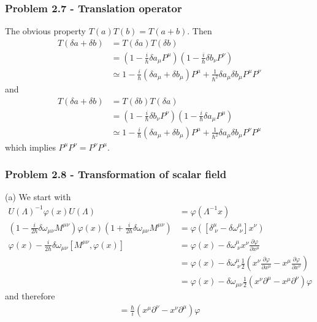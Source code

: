 \documentclass[10pt,a4paper]{book}
\theoremstyle{definition}
\begin{document}
\subsubsection{Problem 2.7 - Translation operator}
The obvious property $T(a)T(b)=T(a+b)$. Then
\begin{align}
T(\delta a+\delta b)&=T(\delta a)T(\delta b)\\
&=\left(1-\frac{i}{\hbar}\delta a_\mu P^\mu\right)\left(1-\frac{i}{\hbar}\delta b_\nu P^\nu\right)\\
&\simeq 1-\frac{i}{\hbar}(\delta a_\mu +\delta b_\mu) P^\mu+\frac{1}{\hbar^2}\delta a_\mu\delta b_\mu P^\mu P^\nu
\end{align}
and 
\begin{align}
T(\delta a+\delta b)&=T(\delta b)T(\delta a)\\
&=\left(1-\frac{i}{\hbar}\delta b_\nu P^\nu\right)\left(1-\frac{i}{\hbar}\delta a_\mu P^\mu\right)\\
&\simeq 1-\frac{i}{\hbar}(\delta a_\mu +\delta b_\mu) P^\mu+\frac{1}{\hbar^2}\delta a_\mu\delta b_\mu P^\nu P^\mu
\end{align}
which implies $P^\mu P^\nu=P^\nu P^\mu$.

\subsubsection{Problem 2.8 - Transformation of scalar field}
(a) We start with
\begin{align}
U(\Lambda)^{-1}\varphi(x)U(\Lambda)&=\varphi(\Lambda^{-1}x)\\
\left(1-\frac{i}{2\hbar}\delta\omega_{\mu\nu}M^{\mu\nu}\right)\varphi(x)\left(1+\frac{i}{2\hbar}\delta\omega_{\mu\nu}M^{\mu\nu}\right)&=\varphi([\delta^\mu_{\;\nu}-\delta\omega^\mu_{\;\nu}]x^\nu)\\
\varphi(x)-\frac{i}{2\hbar}\delta\omega_{\mu\nu}[M^{\mu\nu},\varphi(x)]&=\varphi(x)-\delta\omega^\mu_{\;\nu}x^\nu\frac{\partial\varphi}{\partial x^\mu}\\
&=\varphi(x)-\delta\omega^\mu_{\;\nu}\frac{1}{2}\left(x^\nu\frac{\partial\varphi}{\partial x^\mu}-x^\mu\frac{\partial\varphi}{\partial x^\nu}\right)\\
&=\varphi(x)-\delta\omega_{\mu\nu}\frac{1}{2}\left(x^\nu\partial^\mu-x^\mu\partial^\nu\right)\varphi
\end{align}
and therefore
\begin{align}
[\varphi,M^{\mu\nu}]=\frac{\hbar}{i}(x^\mu\partial^\nu-x^\nu\partial^\mu)\varphi
\end{align}
\end{document}
